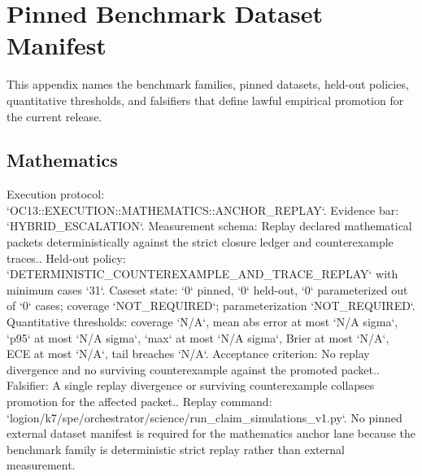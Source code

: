 \section{Pinned Benchmark Dataset Manifest}

This appendix names the benchmark families, pinned datasets, held-out policies, quantitative thresholds, and falsifiers that define lawful empirical promotion for the current release.

\subsection{Mathematics}
Execution protocol: `OC13::EXECUTION::MATHEMATICS::ANCHOR\_REPLAY`. Evidence bar: `HYBRID\_ESCALATION`.
Measurement schema: Replay declared mathematical packets deterministically against the strict closure ledger and counterexample traces..
Held-out policy: `DETERMINISTIC\_COUNTEREXAMPLE\_AND\_TRACE\_REPLAY` with minimum cases `31`.
Caseset state: `0` pinned, `0` held-out, `0` parameterized out of `0` cases; coverage `NOT\_REQUIRED`; parameterization `NOT\_REQUIRED`.
Quantitative thresholds: coverage `N/A`, mean abs error at most `N/A sigma`, `p95` at most `N/A sigma`, `max` at most `N/A sigma`, Brier at most `N/A`, ECE at most `N/A`, tail breaches `N/A`.
Acceptance criterion: No replay divergence and no surviving counterexample against the promoted packet..
Falsifier: A single replay divergence or surviving counterexample collapses promotion for the affected packet..
Replay command: `logion/k7/spe/orchestrator/science/run\_claim\_simulations\_v1.py`.
No pinned external dataset manifest is required for the mathematics anchor lane because the benchmark family is deterministic strict replay rather than external measurement.

